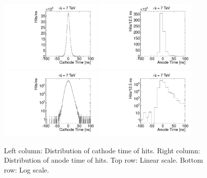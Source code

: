 \begin{figure}
  \begin{center}
      \includegraphics[clip=true, trim=0.0cm 0cm 2.0cm 0cm, width=0.44\textwidth]{figures/timing/CathodeTime}
      \includegraphics[clip=true, trim=0.0cm 0cm 2.0cm 0cm, width=0.44\textwidth]{figures/timing/AnodeTime} \\
      \includegraphics[clip=true, trim=0.0cm 0cm 2.0cm 0cm, width=0.44\textwidth]{figures/timing/CathodeTimeLog}
      \includegraphics[clip=true, trim=0.0cm 0cm 2.0cm 0cm, width=0.44\textwidth]{figures/timing/AnodeTimeLog} \\
      \caption[Distribution of time of anode and cathode hits]
      {Left column: Distribution of cathode time of hits. Right column: Distribution of anode time of hits. Top row: Linear scale. Bottom row: Log scale.
	}
      \label{fig:hittime}
  \end{center}
\end{figure}

